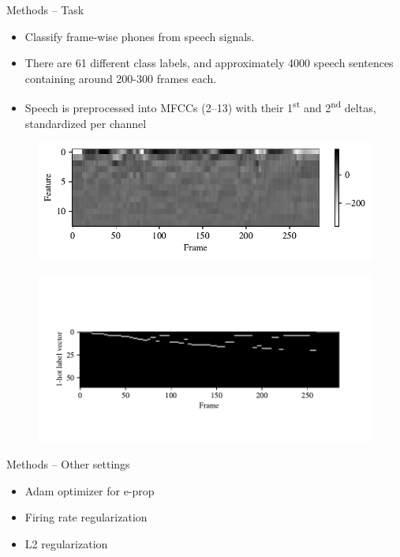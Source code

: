 \documentclass[t]{beamer}
\begin{document}
\begin{frame}{Methods -- Task}
  \begin{itemize}[label=--]
    \item Classify frame-wise phones from speech signals.
    \item There are 61 different class labels, and approximately 4000 speech sentences containing around 200-300 frames each.
    \item Speech is preprocessed into MFCCs (2--13) with their 1\textsuperscript{st} and 2\textsuperscript{nd} deltas, standardized per channel
  \end{itemize}
  \begin{figure}[!ht]
    \centering
    \includegraphics[width=\linewidth]{norm_mfcc}
  \end{figure}
  \begin{figure}[!ht]
    \centering
    \includegraphics[width=\linewidth]{target}
  \end{figure}
\end{frame}

\begin{frame}{Methods -- Other settings}
  \begin{itemize}[label=--]
    \item Adam optimizer for e-prop
    \item Firing rate regularization
    \item L2 regularization
  \end{itemize}
\end{frame}
\end{document}
